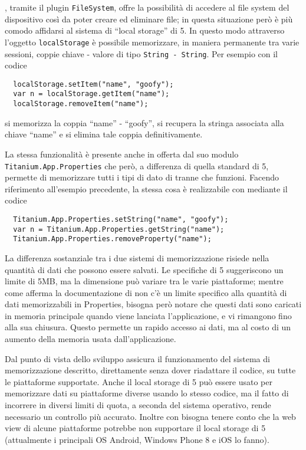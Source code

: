             \pg{}, tramite il plugin
            \texttt{FileSystem}, offre la possibilità di accedere al file system
            del dispositivo così da poter creare ed eliminare file; in questa
            situazione però è più comodo affidarsi al sistema di ``lo\-cal stor\-age''
            di \html{}5. In questo modo attraverso l'oggetto \js{} \texttt{localStorage}
            è possibile memorizzare, in maniera permanente tra varie sessioni, coppie
            chiave - valore di tipo \texttt{String - String}. Per esempio con il
            codice
            \begin{lstlisting}
  localStorage.setItem("name", "goofy");
  var n = localStorage.getItem("name");
  localStorage.removeItem("name");
            \end{lstlisting}
            si memorizza la coppia ``name'' - ``goofy'', si recupera la stringa associata
            alla chiave ``name'' e si elimina tale coppia definitivamente.

            La stessa funzionalità è presente anche in \tisdk{} offerta dal suo
            modulo \texttt{Titanium.App.Properties} che però, a differenza di
            quella standard di \html{}5, permette di memorizzare tutti i tipi di
            dato di \js{} tranne che funzioni. Facendo riferimento all'esempio
            precedente, la stessa cosa è realizzabile con \tisdk{} mediante il
            codice
            \begin{lstlisting}
  Titanium.App.Properties.setString("name", "goofy");
  var n = Titanium.App.Properties.getString("name");
  Titanium.App.Properties.removeProperty("name");
            \end{lstlisting}

            La differenza sostanziale tra i due sistemi di memorizzazione risiede
            nella quantità di dati che possono essere salvati.
            Le specifiche di \html{}5 suggeriscono un limite di 5MB, ma la dimensione
            può variare tra le varie piattaforme; mentre come afferma la documentazione
            di \tisdk{} non c'è un limite specifico alla quantità di dati memorizzabili
            in Properties, bisogna però notare che questi dati sono caricati in
            memoria principale quando
            viene lanciata l'applicazione, e vi rimangono fino alla sua chiusura.
            Questo permette un rapido accesso ai dati, ma al costo di un aumento
            della memoria usata dall'applicazione.

            Dal punto di vista dello sviluppo \crossplat{} \tisdk{} assicura il funzionamento
            del sistema di memorizzazione descritto, direttamente senza dover riadattare il codice,
            su tutte le piattaforme supportate. Anche il local storage
            di \html{}5 può essere usato per memorizzare dati su piattaforme diverse
            usando lo stesso codice, ma il fatto di incorrere in diversi limiti di quota,
            a seconda del sistema operativo, rende necessario un controllo più
            accurato. Inoltre con \pg{} bisogna tenere conto che la web view di
            alcune piattaforme potrebbe non supportare il local storage di \html{}5
            (attualmente i principali OS Android, Windows Phone 8 e iOS lo fanno).

